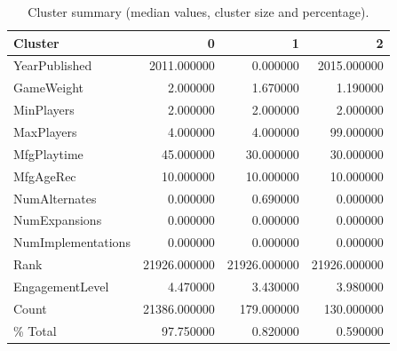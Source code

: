\begin{table}
\caption{Cluster summary (median values, cluster size and percentage).}
\label{tab:cluster_summary}
\begin{tabular}{lrrr}
\toprule
Cluster & 0 & 1 & 2 \\
\midrule
YearPublished & 2011.000000 & 0.000000 & 2015.000000 \\
GameWeight & 2.000000 & 1.670000 & 1.190000 \\
MinPlayers & 2.000000 & 2.000000 & 2.000000 \\
MaxPlayers & 4.000000 & 4.000000 & 99.000000 \\
MfgPlaytime & 45.000000 & 30.000000 & 30.000000 \\
MfgAgeRec & 10.000000 & 10.000000 & 10.000000 \\
NumAlternates & 0.000000 & 0.690000 & 0.000000 \\
NumExpansions & 0.000000 & 0.000000 & 0.000000 \\
NumImplementations & 0.000000 & 0.000000 & 0.000000 \\
Rank & 21926.000000 & 21926.000000 & 21926.000000 \\
EngagementLevel & 4.470000 & 3.430000 & 3.980000 \\
Count & 21386.000000 & 179.000000 & 130.000000 \\
\% Total & 97.750000 & 0.820000 & 0.590000 \\
\bottomrule
\end{tabular}
\end{table}
